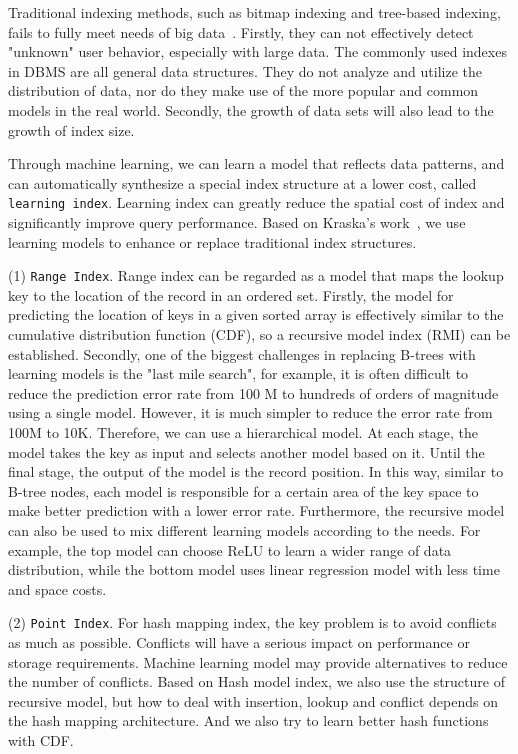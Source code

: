 Traditional indexing methods, such as bitmap indexing and tree-based indexing, fails to fully meet needs of big data~\cite{DBLP:journals/kais/GaniSSH16}. Firstly, they can not effectively detect "unknown" user behavior, especially with large data. The commonly used indexes in DBMS are all general data structures. They do not analyze and utilize the distribution of data, nor do they make use of the more popular and common models in the real world. Secondly, the growth of data sets will also lead to the growth of index size.

Through machine learning, we can learn a model that reflects data patterns, and can automatically synthesize a special index structure at a lower cost, called \texttt{learning index}. Learning index can greatly reduce the spatial cost of index and significantly improve query performance. Based on Kraska's work~\cite{DBLP:conf/sigmod/KraskaBCDP18}, we use learning models to enhance or replace traditional index structures.

(1) \texttt{Range Index}. Range index can be regarded as a model that maps the lookup key to the location of the record in an ordered set. 
Firstly, the model for predicting the location of keys in a given sorted array is effectively similar to the cumulative distribution function (CDF), so a recursive model index (RMI) can be established.
Secondly, one of the biggest challenges in replacing B-trees with learning models is the "last mile search", for example, it is often difficult to reduce the prediction error rate from 100 M to hundreds of orders of magnitude using a single model. However, it is much simpler to reduce the error rate from 100M to 10K. Therefore, we can use a hierarchical model. At each stage, the model takes the key as input and selects another model based on it. Until the final stage, the output of the model is the record position. In this way, similar to B-tree nodes, each model is responsible for a certain area of the key space to make better prediction with a lower error rate.
Furthermore, the recursive model can also be used to mix different learning models according to the needs. For example, the top model can choose ReLU to learn a wider range of data distribution, while the bottom model uses linear regression model with less time and space costs.

(2) \texttt{Point Index}. For hash mapping index, the key problem is to avoid conflicts as much as possible. Conflicts will have a serious impact on performance or storage requirements. Machine learning model may provide alternatives to reduce the number of conflicts. Based on Hash model index, we also use the structure of recursive model, but how to deal with insertion, lookup and conflict depends on the hash mapping architecture. And we also try to learn better hash functions with CDF.

